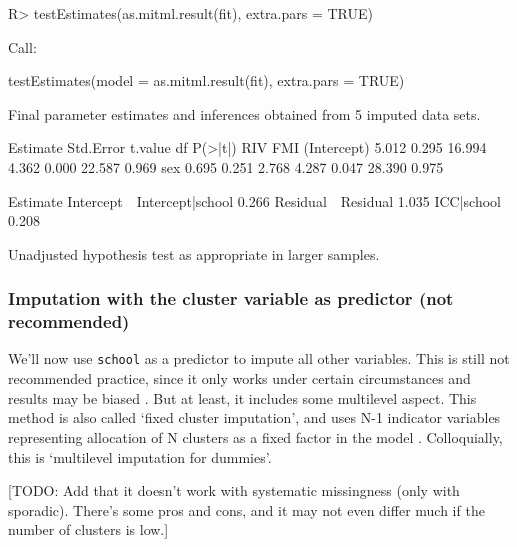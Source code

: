 \documentclass[
]{jss}
\begin{document}
\begin{CodeChunk}
\begin{CodeInput}
R> testEstimates(as.mitml.result(fit), extra.pars = TRUE)
\end{CodeInput}
\begin{CodeOutput}

Call:

testEstimates(model = as.mitml.result(fit), extra.pars = TRUE)

Final parameter estimates and inferences obtained from 5 imputed data sets.

             Estimate Std.Error   t.value        df   P(>|t|)       RIV       FMI 
(Intercept)     5.012     0.295    16.994     4.362     0.000    22.587     0.969 
sex             0.695     0.251     2.768     4.287     0.047    28.390     0.975 

                            Estimate 
Intercept~~Intercept|school    0.266 
Residual~~Residual             1.035 
ICC|school                     0.208 

Unadjusted hypothesis test as appropriate in larger samples.
\end{CodeOutput}
\end{CodeChunk}

\hypertarget{imputation-with-the-cluster-variable-as-predictor-not-recommended}{%
\subsubsection{Imputation with the cluster variable as predictor (not
recommended)}\label{imputation-with-the-cluster-variable-as-predictor-not-recommended}}

We'll now use \texttt{school} as a predictor to impute all other
variables. This is still not recommended practice, since it only works
under certain circumstances and results may be biased
\citep{drec15, ende16}. But at least, it includes some multilevel
aspect. This method is also called `fixed cluster imputation', and uses
N-1 indicator variables representing allocation of N clusters as a fixed
factor in the model \citep{reit06, ende16}. Colloquially, this is
`multilevel imputation for dummies'.

{[}TODO: Add that it doesn't work with systematic missingness (only with
sporadic). There's some pros and cons, and it may not even differ much
if the number of clusters is low.{]}
\end{document}
